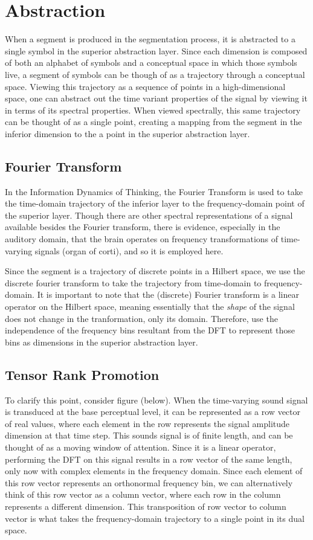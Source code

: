 \section{Abstraction}

When a segment is produced in the segmentation process, it is abstracted to a single symbol in the superior abstraction layer.  Since each dimension is composed of both an alphabet of symbols and a conceptual space in which those symbols live, a segment of symbols can be though of as a trajectory through a conceptual space.  Viewing this trajectory as a sequence of points in a high-dimensional space, one can abstract out the time variant properties of the signal by viewing it in terms of its spectral properties.  When viewed spectrally, this same trajectory can be thought of as a single point, creating a mapping from the segment in the inferior dimension to the a point in the superior abstraction layer.

\subsection{Fourier Transform}
In the Information Dynamics of Thinking, the Fourier Transform is used to take the time-domain trajectory of the inferior layer to the frequency-domain point of the superior layer.  Though there are other spectral representations of a signal available besides the Fourier transform, there is evidence, especially in the auditory domain, that the brain operates on frequency transformations of time-varying signals (organ of corti), and so it is employed here.

Since the segment is a trajectory of discrete points in a Hilbert space, we use the discrete fourier transform to take the trajectory from time-domain to frequency-domain.  It is important to note that the (discrete) Fourier transform is a linear operator on the Hilbert space, meaning essentially that the \textit{shape} of the signal does not change in the tranformation, only its domain.  Therefore, use the independence of the frequency bins resultant from the DFT to represent those bins as dimensions in the superior abstraction layer.

\subsection{Tensor Rank Promotion}
To clarify this point, consider figure (below).  When the time-varying sound signal is transduced at the base perceptual level, it can be represented as a row vector of real values, where each element in the row represents the signal amplitude dimension at that time step. This sounds signal is of finite length, and can be thought of as a moving window of attention. Since it is a linear operator, performing the DFT on this signal results in a row vector of the same length, only now with complex elements in the frequency domain.  Since each element of this row vector represents an orthonormal frequency bin, we can alternatively think of this row vector as a column vector, where each row in the column represents a different dimension.  This transposition of row vector to column vector is what takes the frequency-domain trajectory to a single point in its dual space.

